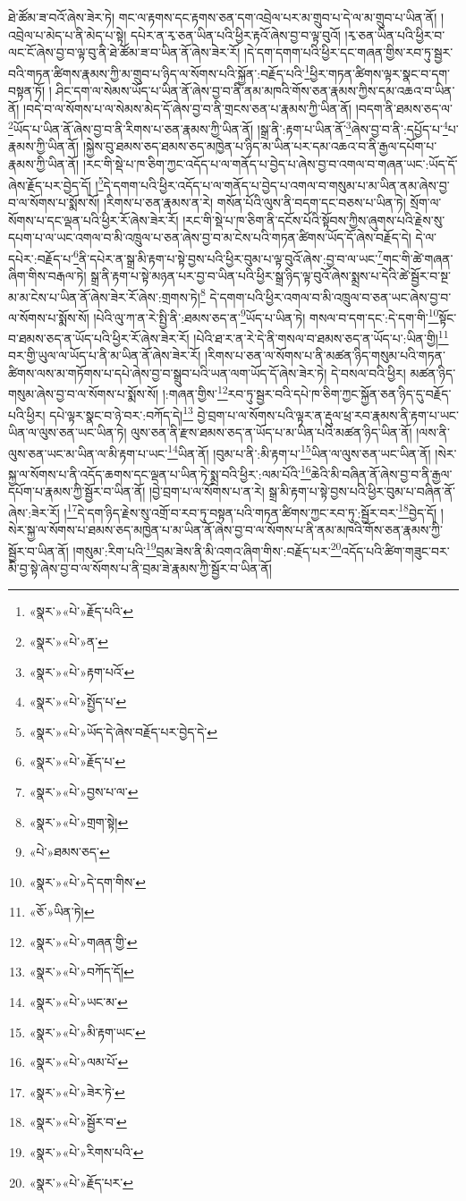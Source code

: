 ཐེ་ཚོམ་ཟ་བའོ་ཞེས་ཟེར་ཏེ། གང་ལ་རྟགས་དང་རྟགས་ཅན་དག་འབྲེལ་པར་མ་གྲུབ་པ་དེ་ལ་མ་གྲུབ་པ་ཡིན་ནོ། །འབྲེལ་པ་མེད་པ་ནི་མེད་པ་སྟེ། དཔེར་ན་རྭ་ཅན་ཡིན་པའི་ཕྱིར་རྟའོ་ཞེས་བྱ་བ་ལྟ་བུའོ། །རྭ་ཅན་ཡིན་པའི་ཕྱིར་བ་ལང་ངོ་ཞེས་བྱ་བ་ལྟ་བུ་ནི་ཐེ་ཚོམ་ཟ་བ་ཡིན་ནོ་ཞེས་ཟེར་རོ། །དེ་དག་དགག་པའི་ཕྱིར་དང་གཞན་གྱིས་རབ་ཏུ་སྦྱར་བའི་གཏན་ཚིགས་རྣམས་ཀྱི་མ་གྲུབ་པ་ཉིད་ལ་སོགས་པའི་སྐྱོན་:བརྗོད་པའི་\footnote{«སྣར་»«པེ་»རྗོད་པའི་}ཕྱིར་གཏན་ཚིགས་ལྟར་སྣང་བ་དག་བསྟན་ཏོ། །
ཤིང་དག་ལ་སེམས་ཡོད་པ་ཡིན་ནོ་ཞེས་བྱ་བ་ནི་ནམ་མཁའི་གོས་ཅན་རྣམས་ཀྱིས་དམ་འཆའ་བ་ཡིན་ནོ། །བདེ་བ་ལ་སོགས་པ་ལ་སེམས་མེད་དོ་ཞེས་བྱ་བ་ནི་གྲངས་ཅན་པ་རྣམས་ཀྱི་ཡིན་ནོ། །བདག་ནི་ཐམས་ཅད་ལ་\footnote{«སྣར་»«པེ་»ན་}ཡོད་པ་ཡིན་ནོ་ཞེས་བྱ་བ་ནི་རིགས་པ་ཅན་རྣམས་ཀྱི་ཡིན་ནོ། །སྒྲ་ནི་:རྟག་པ་ཡིན་ནོ་\footnote{«སྣར་»«པེ་»རྟག་པའོ་}ཞེས་བྱ་བ་ནི་:དཔྱོད་པ་\footnote{«སྣར་»«པེ་»སྤྱོད་པ་}པ་རྣམས་ཀྱི་ཡིན་ནོ། །སྐྱེས་བུ་ཐམས་ཅད་ཐམས་ཅད་མཁྱེན་པ་ཉིད་མ་ཡིན་པར་དམ་འཆའ་བ་ནི་རྒྱལ་དཔོག་པ་རྣམས་ཀྱི་ཡིན་ནོ། །རང་གི་སྡེ་པ་ཁ་ཅིག་ཀྱང་འདོད་པ་ལ་གནོད་པ་བྱེད་པ་ཞེས་བྱ་བ་འགལ་བ་གཞན་ཡང་:ཡོད་དོ་ཞེས་རྗོད་པར་བྱེད་དོ། །\footnote{«སྣར་»«པེ་»ཡོད་དེ་ཞེས་བརྗོད་པར་བྱེད་དེ་}དེ་དགག་པའི་ཕྱིར་འདོད་པ་ལ་གནོད་པ་བྱེད་པ་འགལ་བ་གསུམ་པ་མ་ཡིན་ནམ་ཞེས་བྱ་བ་ལ་སོགས་པ་སྨོས་སོ། །རིགས་པ་ཅན་རྣམས་ན་རེ། གསོན་པོའི་ལུས་ནི་བདག་དང་བཅས་པ་ཡིན་ཏེ། སྲོག་ལ་སོགས་པ་དང་ལྡན་པའི་ཕྱིར་རོ་ཞེས་ཟེར་རོ། །རང་གི་སྡེ་པ་ཁ་ཅིག་ནི་དངོས་པོའི་སྟོབས་ཀྱིས་ཞུགས་པའི་རྗེས་སུ་དཔག་པ་ལ་ཡང་འགལ་བ་མི་འཁྲུལ་པ་ཅན་ཞེས་བྱ་བ་མ་ངེས་པའི་གཏན་ཚིགས་ཡོད་དོ་ཞེས་བརྗོད་དེ། དེ་ལ་དཔེར་:བརྗོད་པ་\footnote{«སྣར་»«པེ་»རྗོད་པ་}ནི་དཔེར་ན་སྒྲ་མི་རྟག་པ་སྟེ་བྱས་པའི་ཕྱིར་བུམ་པ་ལྟ་བུའོ་ཞེས་:བྱ་བ་ལ་ཡང་\footnote{«སྣར་»«པེ་»བྱས་པ་ལ་}གང་གི་ཚེ་གཞན་ཞིག་གིས་བརྒལ་ཏེ། སྒྲ་ནི་རྟག་པ་སྟེ་མཉན་པར་བྱ་བ་ཡིན་པའི་ཕྱིར་སྒྲ་ཉིད་ལྟ་བུའོ་ཞེས་སྨྲས་པ་དེའི་ཚེ་སྦྱོར་བ་སྔ་མ་མ་ངེས་པ་ཡིན་ནོ་ཞེས་ཟེར་རོ་ཞེས་:གྲགས་ཏེ།\footnote{«སྣར་»«པེ་»གྲག་སྟེ།} དེ་དགག་པའི་ཕྱིར་འགལ་བ་མི་འཁྲུལ་བ་ཅན་ཡང་ཞེས་བྱ་བ་ལ་སོགས་པ་སྨོས་སོ། །པེའི་ལུ་ཀ་ན་རེ་སྤྱི་ནི་:ཐམས་ཅད་ན་\footnote{«པེ་»ཐམས་ཅད་}ཡོད་པ་ཡིན་ཏེ། གསལ་བ་དག་དང་:དེ་དག་གི་\footnote{«སྣར་»«པེ་»དེ་དག་གིས་}སྟོང་བ་ཐམས་ཅད་ན་ཡོད་པའི་ཕྱིར་རོ་ཞེས་ཟེར་རོ། །པེའི་ཐ་ར་ན་རེ་དེ་ནི་གསལ་བ་ཐམས་ཅད་ན་ཡོད་པ་:ཡིན་གྱི།\footnote{«ཅོ་»ཡིན་ཏེ།} བར་གྱི་ཡུལ་ལ་ཡོད་པ་ནི་མ་ཡིན་ནོ་ཞེས་ཟེར་རོ། །རིགས་པ་ཅན་ལ་སོགས་པ་ནི་མཚན་ཉིད་གསུམ་པའི་གཏན་ཚིགས་ལས་མ་གཏོགས་པ་དཔེ་ཞེས་བྱ་བ་སྒྲུབ་པའི་ཡན་ལག་ཡོད་དོ་ཞེས་ཟེར་ཏེ། དེ་བསལ་བའི་ཕྱིར། མཚན་ཉིད་གསུམ་ཞེས་བྱ་བ་ལ་སོགས་པ་སྨོས་སོ། །:གཞན་གྱིས་\footnote{«སྣར་»«པེ་»གཞན་གྱི་}རབ་ཏུ་སྦྱར་བའི་དཔེ་ཁ་ཅིག་ཀྱང་སྐྱོན་ཅན་ཉིད་དུ་བརྗོད་པའི་ཕྱིར། དཔེ་ལྟར་སྣང་བ་ཉེ་བར་:བཀོད་དེ།\footnote{«སྣར་»«པེ་»བཀོད་དོ།} བྱེ་བྲག་པ་ལ་སོགས་པའི་ལྟར་ན་རྡུལ་ཕྲ་རབ་རྣམས་ནི་རྟག་པ་ཡང་ཡིན་ལ་ལུས་ཅན་ཡང་ཡིན་ཏེ། ལུས་ཅན་ནི་རྫས་ཐམས་ཅད་ན་ཡོད་པ་མ་ཡིན་པའི་མཚན་ཉིད་ཡིན་ནོ། །ལས་ནི་ལུས་ཅན་ཡང་མ་ཡིན་ལ་མི་རྟག་པ་ཡང་\footnote{«སྣར་»«པེ་»ཡང་མ་}ཡིན་ནོ། །བུམ་པ་ནི་:མི་རྟག་པ་\footnote{«སྣར་»«པེ་»མི་རྟག་ཡང་}ཡིན་ལ་ལུས་ཅན་ཡང་ཡིན་ནོ། །སེར་སྐྱ་ལ་སོགས་པ་ནི་འདོད་ཆགས་དང་ལྡན་པ་ཡིན་ཏེ་སྨྲ་བའི་ཕྱིར་:ལམ་པོའི་\footnote{«སྣར་»«པེ་»ལམ་པོ་}ཆེའི་མི་བཞིན་ནོ་ཞེས་བྱ་བ་ནི་རྒྱལ་དཔོག་པ་རྣམས་ཀྱི་སྦྱོར་བ་ཡིན་ནོ། །བྱེ་བྲག་པ་ལ་སོགས་པ་ན་རེ། སྒྲ་མི་རྟག་པ་སྟེ་བྱས་པའི་ཕྱིར་བུམ་པ་བཞིན་ནོ་ཞེས་:ཟེར་རོ། །\footnote{«སྣར་»«པེ་»ཟེར་ཏེ་}དེ་དག་ཉིད་རྗེས་སུ་འགྲོ་བ་རབ་ཏུ་བསྟན་པའི་གཏན་ཚིགས་ཀྱང་རབ་ཏུ་:སྦྱོར་བར་\footnote{«སྣར་»«པེ་»སྦྱོར་བ་}བྱེད་དོ། །སེར་སྐྱ་ལ་སོགས་པ་ཐམས་ཅད་མཁྱེན་པ་མ་ཡིན་ནོ་ཞེས་བྱ་བ་ལ་སོགས་པ་ནི་ནམ་མཁའི་གོས་ཅན་རྣམས་ཀྱི་སྦྱོར་བ་ཡིན་ནོ། །གསུམ་:རིག་པའི་\footnote{«སྣར་»«པེ་»རིགས་པའི་}བྲམ་ཟེས་ནི་མི་འགའ་ཞིག་གིས་:བརྗོད་པར་\footnote{«སྣར་»«པེ་»རྗོད་པར་}འདོད་པའི་ཚིག་གཟུང་བར་མི་བྱ་སྟེ་ཞེས་བྱ་བ་ལ་སོགས་པ་ནི་བྲམ་ཟེ་རྣམས་ཀྱི་སྦྱོར་བ་ཡིན་ནོ། 